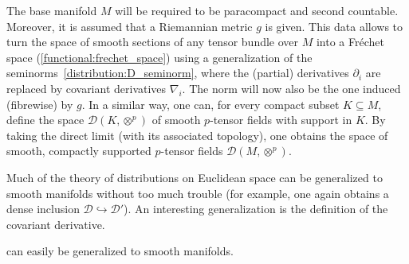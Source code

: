     The base manifold $M$ will be required to be paracompact and second countable. Moreover, it is assumed that a Riemannian metric $g$ is given. This data allows to turn the space of smooth sections of any tensor bundle over $M$ into a Fr\'echet space (\cref{functional:frechet_space}) using a generalization of the seminorms~\eqref{distribution:D_seminorm}, where the (partial) derivatives $\partial_i$ are replaced by covariant derivatives $\nabla_i$. The norm will now also be the one induced (fibrewise) by $g$. In a similar way, one can, for every compact subset $K\subseteq M$, define the space $\mathcal{D}(K,\otimes^p)$ of smooth $p$-tensor fields with support in $K$. By taking the direct limit (with its associated topology), one obtains the space of smooth, compactly supported $p$-tensor fields $\mathcal{D}(M,\otimes^p)$.


    Much of the theory of distributions on Euclidean space can be generalized to smooth manifolds without too much trouble (for example, one again obtains a dense inclusion $\mathcal{D}\hookrightarrow\mathcal{D}'$). An interesting generalization is the definition of the covariant derivative.

     can easily be generalized to smooth manifolds.

